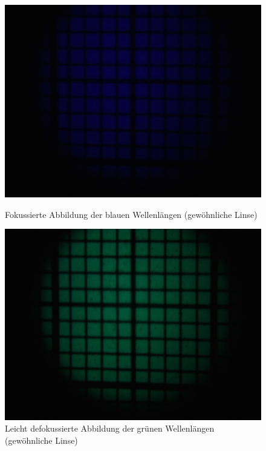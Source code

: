 \begin{figure}[h!]
	\begin{minipage}[t]{0.32\textwidth}
		\includegraphics[clip=true, trim=700px 950px 900px 250px, width=\linewidth]{img/ChromAbb/Prakt_Linsenfehler_2015_06_04_068}
		\caption{Fokussierte Abbildung der blauen Wellenlängen (gewöhnliche Linse)}
		\label{fig:cm_blau}
	\end{minipage}
	\hfill
	\begin{minipage}[t]{0.32\textwidth}
		\includegraphics[clip=true, trim=707px 950px 907px 250px, width=\linewidth]{img/ChromAbb/Prakt_Linsenfehler_2015_06_04_069}
		\caption{Leicht defokussierte Abbildung der grünen Wellenlängen (gewöhnliche Linse)}
		\label{fig:cm_gruen}
	\end{minipage}

\end{figure}
